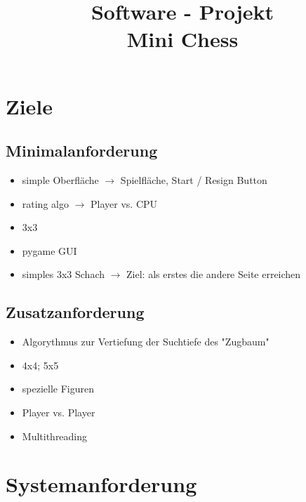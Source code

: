 \documentclass{article}
\title{\textbf{Software - Projekt\\Mini Chess}}
\date{\vspace{-5ex}}
\begin{document}
\maketitle
\thispagestyle{fancy}


\tableofcontents
\newpage


\section{Ziele}\label{section-goals}

\subsection{Minimalanforderung}
\begin{itemize}
    \item simple Oberfläche $\rightarrow$ Spielfläche, Start / Resign Button
    \item rating algo $\rightarrow$ Player vs. CPU
    \item 3x3
    \item pygame GUI
    \item simples 3x3 Schach $\rightarrow$ Ziel: als erstes die andere Seite erreichen
\end{itemize}

\subsection{Zusatzanforderung}
\begin{itemize}
    \item Algorythmus zur Vertiefung der Suchtiefe des "Zugbaum"
    \item 4x4; 5x5
    \item spezielle Figuren
    \item Player vs. Player
    \item Multithreading
\end{itemize}


\newpage
\section{Systemanforderung}\label{section-requirements}
\end{document}
